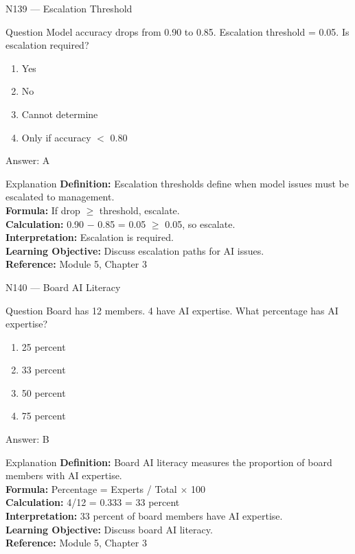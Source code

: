 \documentclass[aspectratio=169,8pt]{beamer}
\begin{document}
	\begin{frame}{N139 --- Escalation Threshold}
		\begin{block}{Question}
			Model accuracy drops from 0.90 to 0.85. Escalation threshold = 0.05. Is escalation required?
			\begin{enumerate}
				\item Yes
				\item No
				\item Cannot determine
				\item Only if accuracy $<$ 0.80
			\end{enumerate}
		\end{block}
		\begin{exampleblock}{Answer: A}\end{exampleblock}
		\begin{block}{Explanation}
			\textbf{Definition:} Escalation thresholds define when model issues must be escalated to management.\\
			\textbf{Formula:} If drop $\geq$ threshold, escalate.\\
			\textbf{Calculation:} 0.90 $-$ 0.85 = 0.05 $\geq$ 0.05, so escalate.\\
			\textbf{Interpretation:} Escalation is required.\\
			\textbf{Learning Objective:} Discuss escalation paths for AI issues.\\
			\textbf{Reference:} Module 5, Chapter 3
		\end{block}
	\end{frame}
	
	\begin{frame}{N140 --- Board AI Literacy}
		\begin{block}{Question}
			Board has 12 members. 4 have AI expertise. What percentage has AI expertise?
			\begin{enumerate}
				\item 25 percent
				\item 33 percent
				\item 50 percent
				\item 75 percent
			\end{enumerate}
		\end{block}
		\begin{exampleblock}{Answer: B}\end{exampleblock}
		\begin{block}{Explanation}
			\textbf{Definition:} Board AI literacy measures the proportion of board members with AI expertise.\\
			\textbf{Formula:} Percentage = Experts / Total $\times$ 100\\
			\textbf{Calculation:} 4/12 = 0.333 = 33 percent\\
			\textbf{Interpretation:} 33 percent of board members have AI expertise.\\
			\textbf{Learning Objective:} Discuss board AI literacy.\\
			\textbf{Reference:} Module 5, Chapter 3
		\end{block}
	\end{frame}
	
\end{document}

